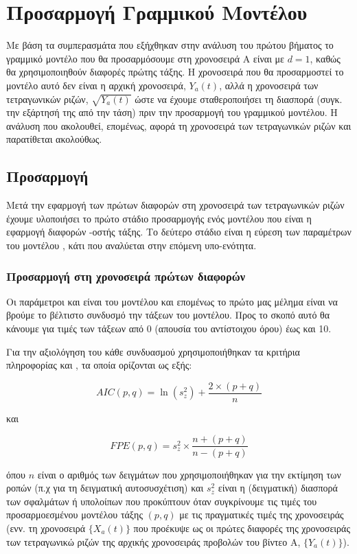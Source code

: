 \chapter{Προσαρμογή Γραμμικού Μοντέλου}
\label{ch:step2}
\thispagestyle{fancy}

Με βάση τα συμπερασμάτα που εξήχθηκαν στην ανάλυση του πρώτου βήματος το γραμμικό μοντέλο που θα προσαρμόσουμε στη χρονοσειρά Α είναι  με $d=1$, καθώς θα χρησιμοποιηθούν διαφορές πρώτης τάξης. Η χρονοσειρά που θα προσαρμοστεί το μοντέλο αυτό δεν είναι η αρχική χρονοσειρά, $Y_a(t)$, αλλά η χρονοσειρά των τετραγωνικών ριζών, $\sqrt{Y_a(t)}$ ώστε να έχουμε σταθεροποιήσει τη διασπορά (συγκ. την εξάρτησή της από την τάση) πριν την προσαρμογή του γραμμικού μοντέλου. Η ανάλυση που ακολουθεί, επομένως, αφορά τη χρονοσειρά των τετραγωνικών ριζών και παρατίθεται ακολούθως.

\section{Προσαρμογή }

Μετά την εφαρμογή των πρώτων διαφορών στη χρονοσειρά των τετραγωνικών ριζών έχουμε υλοποιήσει το πρώτο στάδιο προσαρμογής ενός μοντέλου  που είναι η εφαρμογή διαφορών -οστής τάξης. Το δεύτερο στάδιο είναι η εύρεση των παραμέτρων του μοντέλου , κάτι που αναλύεται στην επόμενη υπο-ενότητα. 

\subsection{Προσαρμογή  στη χρονοσειρά πρώτων διαφορών}

Οι παράμετροι  και  είναι  του μοντέλου και επομένως το πρώτο μας μέλημα είναι να βρούμε το βέλτιστο συνδυσμό την τάξεων του μοντέλου. Προς το σκοπό αυτό θα κάνουμε  για τιμές των τάξεων από 0 (απουσία του αντίστοιχου  όρου) έως και 10.\par

Για την αξιολόγηση του κάθε συνδυασμού χρησιμοποιήθηκαν τα κριτήρια πληροφορίας  και , τα οποία ορίζονται ως εξής:

\[ AIC(p,q) = \ln{(s_z^2)} + \frac{2\times(p+q)}{n} \]

και

\[ FPE(p,q) = s_z^2 \times \frac{n + (p+q)}{n - (p+q)} \]

όπου $n$ είναι ο αριθμός των δειγμάτων που χρησιμοποιήθηκαν για την εκτίμηση των ροπών (π.χ για τη δειγματική αυτοσυσχέτιση) και $s_z^2$ είναι η (δειγματική) διασπορά των σφαλμάτων ή υπολοίπων που προκύπτουν όταν συγκρίνουμε τις τιμές του προσαρμοεσμένου μοντέλου τάξης $(p,q)$ με τις πραγματικές τιμές της χρονοσειράς (ενν. τη χρονοσειρά $\{X_a(t)\}$ που προέκυψε ως οι πρώτες διαφορές της χρονοσειράς των τετραγωνικώ ριζών της αρχικής χρονοσειράς προβολών του βίντεο Α, $\{Y_a(t)\}$). \par

